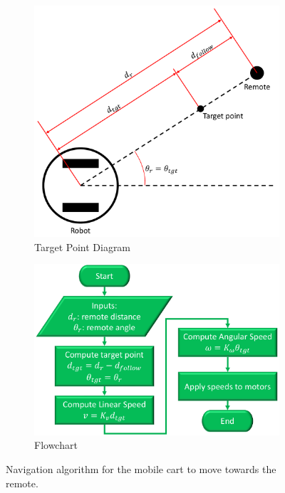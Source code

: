 \documentclass[conference]{IEEEtran}
\begin{document}
\begin{figure}[htbp]
    \centering
    \begin{subfigure}{0.45\linewidth}
        \centering
        \includegraphics[width=\textwidth]{figs/navigationAlgorithmDiagram.pdf}
        \caption{Target Point Diagram}
        \label{fig:navAlgoDiagram}
    \end{subfigure}%
    \begin{subfigure}{0.45\linewidth}
        \centering
        \includegraphics[width=\textwidth]{figs/navigationAlgorithmFlowchart.pdf}
        \caption{Flowchart}
        \label{fig:navAlgoFlowchart}
    \end{subfigure}
    \caption{Navigation algorithm for the mobile cart to move towards the remote.}
    \label{fig:navAlgoDetails}
\end{figure}
\end{document}
